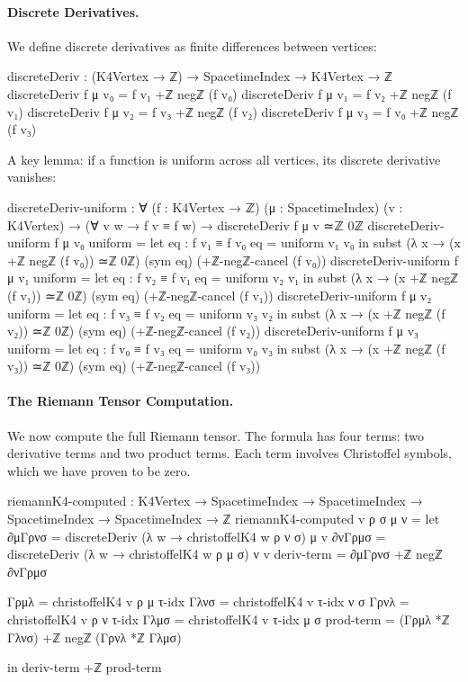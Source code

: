 \documentclass[11pt,a4paper]{book}
\begin{document}
\paragraph{Discrete Derivatives.}
We define discrete derivatives as finite differences between vertices:

\begin{code}
discreteDeriv : (K4Vertex → ℤ) → SpacetimeIndex → K4Vertex → ℤ
discreteDeriv f μ v₀ = f v₁ +ℤ negℤ (f v₀)
discreteDeriv f μ v₁ = f v₂ +ℤ negℤ (f v₁)
discreteDeriv f μ v₂ = f v₃ +ℤ negℤ (f v₂)
discreteDeriv f μ v₃ = f v₀ +ℤ negℤ (f v₃)
\end{code}

A key lemma: if a function is uniform across all vertices, its discrete derivative vanishes:

\begin{code}
discreteDeriv-uniform : ∀ (f : K4Vertex → ℤ) (μ : SpacetimeIndex) (v : K4Vertex) →
                        (∀ v w → f v ≡ f w) → discreteDeriv f μ v ≃ℤ 0ℤ
discreteDeriv-uniform f μ v₀ uniform = 
  let eq : f v₁ ≡ f v₀
      eq = uniform v₁ v₀
  in subst (λ x → (x +ℤ negℤ (f v₀)) ≃ℤ 0ℤ) (sym eq) (+ℤ-negℤ-cancel (f v₀))
discreteDeriv-uniform f μ v₁ uniform = 
  let eq : f v₂ ≡ f v₁
      eq = uniform v₂ v₁
  in subst (λ x → (x +ℤ negℤ (f v₁)) ≃ℤ 0ℤ) (sym eq) (+ℤ-negℤ-cancel (f v₁))
discreteDeriv-uniform f μ v₂ uniform = 
  let eq : f v₃ ≡ f v₂
      eq = uniform v₃ v₂
  in subst (λ x → (x +ℤ negℤ (f v₂)) ≃ℤ 0ℤ) (sym eq) (+ℤ-negℤ-cancel (f v₂))
discreteDeriv-uniform f μ v₃ uniform = 
  let eq : f v₀ ≡ f v₃
      eq = uniform v₀ v₃
  in subst (λ x → (x +ℤ negℤ (f v₃)) ≃ℤ 0ℤ) (sym eq) (+ℤ-negℤ-cancel (f v₃))
\end{code}

\paragraph{The Riemann Tensor Computation.}

We now compute the full Riemann tensor. The formula has four terms: two derivative terms 
and two product terms. Each term involves Christoffel symbols, which we have proven to be zero.

\begin{code}
riemannK4-computed : K4Vertex → SpacetimeIndex → SpacetimeIndex → 
                     SpacetimeIndex → SpacetimeIndex → ℤ
riemannK4-computed v ρ σ μ ν = 
  let
      ∂μΓρνσ = discreteDeriv (λ w → christoffelK4 w ρ ν σ) μ v
      ∂νΓρμσ = discreteDeriv (λ w → christoffelK4 w ρ μ σ) ν v
      deriv-term = ∂μΓρνσ +ℤ negℤ ∂νΓρμσ
      
      Γρμλ = christoffelK4 v ρ μ τ-idx
      Γλνσ = christoffelK4 v τ-idx ν σ
      Γρνλ = christoffelK4 v ρ ν τ-idx
      Γλμσ = christoffelK4 v τ-idx μ σ
      prod-term = (Γρμλ *ℤ Γλνσ) +ℤ negℤ (Γρνλ *ℤ Γλμσ)
      
  in deriv-term +ℤ prod-term
\end{code}
\end{document}
